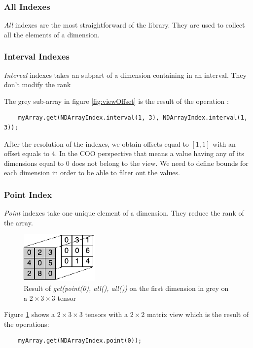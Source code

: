 \subsubsection{All Indexes}
\textit{All} indexes are the most straightforward of the library. They are used to collect all the elements of a dimension.

\subsubsection{Interval Indexes}
\textit{Interval} indexes takes an subpart of a dimension containing in an interval. They don't modify the rank

The grey sub-array in figure \ref{fig:viewOffset} is the result of the operation :
\begin{lstlisting}
	myArray.get(NDArrayIndex.interval(1, 3), NDArrayIndex.interval(1, 3));
\end{lstlisting} 
After the resolution of the indexes, we obtain offsets equal to $[1, 1]$ with an offset equals to $4$.
In the COO perspective that means a value having any of its dimensions equal to 0 does not belong to the view. We need to define bounds for each dimension in order to be able to filter out the values.

\subsubsection{Point Index}
\textit{Point} indexes take one unique element of a dimension. They reduce the rank of the array.

\begin{figure}[!h]
	\centering
	\includegraphics[width=1.5in]{images/tensorsHiglighted.pdf}
	\caption{Result of \textit{get(point(0), all(), all())} on the first dimension in grey on a $2\times 3\times 3$ tensor}
	\label{fig:pointTensor}
\end{figure}

Figure \ref{fig:pointTensor} shows a $2\times 3\times 3$ tensors with a $2\times 2$ matrix view which is the result of the operations:
\begin{lstlisting}
	myArray.get(NDArrayIndex.point(0));
\end{lstlisting} 

